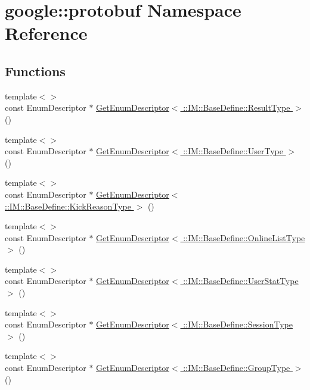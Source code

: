 \hypertarget{namespacegoogle_1_1protobuf}{}\section{google\+:\+:protobuf Namespace Reference}
\label{namespacegoogle_1_1protobuf}
\subsection*{Functions}
\begin{DoxyCompactItemize}
\item 
{\footnotesize template$<$$>$ }\\const Enum\+Descriptor $\ast$ \hyperlink{namespacegoogle_1_1protobuf_a9360ac7f2abc42d6c4bde8f8d8b71e6e}{Get\+Enum\+Descriptor$<$ \+::\+I\+M\+::\+Base\+Define\+::\+Result\+Type $>$} ()
\item 
{\footnotesize template$<$$>$ }\\const Enum\+Descriptor $\ast$ \hyperlink{namespacegoogle_1_1protobuf_a46f01c6d38fabb781a7288474e6b4a95}{Get\+Enum\+Descriptor$<$ \+::\+I\+M\+::\+Base\+Define\+::\+User\+Type $>$} ()
\item 
{\footnotesize template$<$$>$ }\\const Enum\+Descriptor $\ast$ \hyperlink{namespacegoogle_1_1protobuf_a4245dc54116c40799c84dad8bd5b5bd7}{Get\+Enum\+Descriptor$<$ \+::\+I\+M\+::\+Base\+Define\+::\+Kick\+Reason\+Type $>$} ()
\item 
{\footnotesize template$<$$>$ }\\const Enum\+Descriptor $\ast$ \hyperlink{namespacegoogle_1_1protobuf_a584d09c272a1296c4fa439caf27801e6}{Get\+Enum\+Descriptor$<$ \+::\+I\+M\+::\+Base\+Define\+::\+Online\+List\+Type $>$} ()
\item 
{\footnotesize template$<$$>$ }\\const Enum\+Descriptor $\ast$ \hyperlink{namespacegoogle_1_1protobuf_af14b223f151cdd73076bdbeb6879ecb0}{Get\+Enum\+Descriptor$<$ \+::\+I\+M\+::\+Base\+Define\+::\+User\+Stat\+Type $>$} ()
\item 
{\footnotesize template$<$$>$ }\\const Enum\+Descriptor $\ast$ \hyperlink{namespacegoogle_1_1protobuf_acd0c8265cefd362898839329738de617}{Get\+Enum\+Descriptor$<$ \+::\+I\+M\+::\+Base\+Define\+::\+Session\+Type $>$} ()
\item 
{\footnotesize template$<$$>$ }\\const Enum\+Descriptor $\ast$ \hyperlink{namespacegoogle_1_1protobuf_abe7413ad3e4beff4ba2647baa77a4fbf}{Get\+Enum\+Descriptor$<$ \+::\+I\+M\+::\+Base\+Define\+::\+Group\+Type $>$} ()
\end{DoxyCompactItemize}


